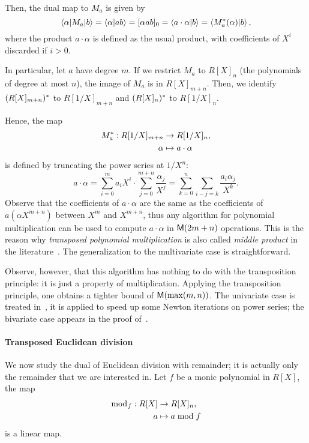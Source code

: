 Then, the dual map to $M_a$ is given by
\begin{equation}
  \label{eq:229}
  \left\langle \alpha \middle| M_a \middle| b \right\rangle = \left\langle \alpha \middle| ab \right\rangle = [\alpha ab]_0 =
  \left\langle a\cdot\alpha \middle| b \right\rangle = \left\langle M_a^\ast(\alpha) \middle| b \right\rangle
  \text{,}
\end{equation}
where the product $a\cdot\alpha$ is defined as the usual product,
with coefficients of $X^i$ discarded if $i>0$.

In particular, let $a$ have degree $m$. If we restrict $M_a$ to
$R[X]_n$ (the polynomials of degree at most $n$), the image of $M_a$
is in $R[X]_{m+n}$. Then, we identify $(R[X]_{m+n})^\ast$ to
$R[1/X]_{m+n}$ and $(R[X]_n)^\ast$ to $R[1/X]_n$. 

Hence, the map 
\begin{equation}
  \label{eq:231}
  \begin{aligned}
    M_a^\ast:R[1/X]_{m+n}&\rightarrow R[1/X]_n\text{,}\\
    \alpha&\mapsto a\cdot\alpha  
  \end{aligned}
\end{equation}
is defined by truncating the power series at $1/X^n$:
\begin{equation}
  \label{eq:230}
  a\cdot\alpha = \sum_{i=0}^ma_iX^i \cdot \sum_{j=0}^{m+n}\frac{\alpha_j}{X^j} =
  \sum_{k=0}^{n}\sum_{i-j=k}\frac{a_i\alpha_j}{X^k}
  \text{.}
\end{equation}
Observe that the coefficients of $a\cdot\alpha$ are the same as the
coefficients of $a(\alpha X^{m+n})$ between $X^{m}$ and $X^{m+n}$,
thus any algorithm for polynomial multiplication can be used to
compute $a\cdot\alpha$ in $\mathsf{M}(2m+n)$ operations. This is the reason
why \emph{transposed polynomial multiplication} is also called
\emph{middle product} in the
literature~\cite{bostan+lecerf+schost:tellegen,hanrot+quercia+zimmermann}.
The generalization to the multivariate case is straightforward.

Observe, however, that this algorithm has nothing to do with the
transposition principle: it is just a property of
multiplication. Applying the transposition principle, one obtains a
tighter bound of $\mathsf{M}(\max(m,n))$. The univariate case is treated
in~\cite{hanrot+quercia+zimmermann,bostan+lecerf+schost:tellegen}, it
is applied to speed up some Newton iterations on power series; the
bivariate case appears in the proof
of~\cite[Corollary~2]{pascal+schost06}.

\paragraph{Transposed Euclidean division}
\label{sec:transp-eucl-divis}
We now study the dual of Euclidean division with remainder; it is
actually only the remainder that we are interested in. Let $f$ be a
monic polynomial in $R[X]$, the map 
\begin{equation}
  \label{eq:238}
  \begin{aligned}
    \bmod_f:R[X]&\rightarrow R[X]_n\text{,}\\
    a&\mapsto a\bmod f
  \end{aligned}
\end{equation}
is a linear map.

